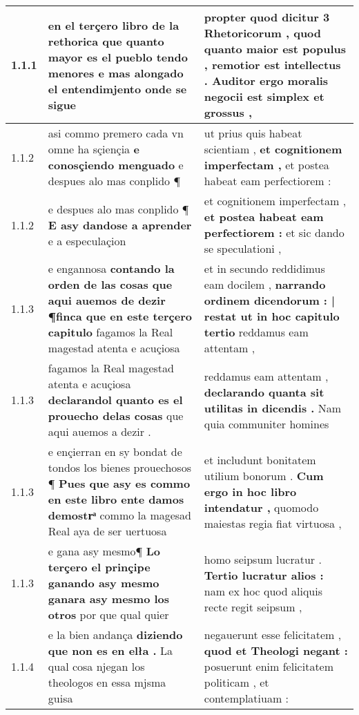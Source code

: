 \begin{tabular}{|p{1cm}|p{6.5cm}|p{6.5cm}|}

\hline
1.1.1 & en el terçero libro de la rethorica \textbf{ que quanto mayor es el pueblo tendo menores } e mas alongado el entendimjento onde se sigue & propter quod dicitur 3 Rhetoricorum , \textbf{ quod quanto maior est populus , } remotior est intellectus . Auditor ergo moralis negocii est simplex et grossus , \\\hline
1.1.2 & asi commo premero cada vn omne ha sçiençia \textbf{ e conosçiendo menguado } e despues alo mas conplido ¶ & ut prius quis habeat scientiam , \textbf{ et cognitionem imperfectam , } et postea habeat eam perfectiorem : \\\hline
1.1.2 & e despues alo mas conplido ¶ \textbf{ E asy dandose a aprender } e a especulaçion & et cognitionem imperfectam , \textbf{ et postea habeat eam perfectiorem : } et sic dando se speculationi , \\\hline
1.1.3 & e engannosa \textbf{ contando la orden de las cosas que aqui auemos de dezir ¶finca que en este terçero capitulo } fagamos la Real magestad atenta e acuçiosa & et in secundo reddidimus eam docilem , \textbf{ narrando ordinem dicendorum : | restat ut in hoc capitulo tertio } reddamus eam attentam , \\\hline
1.1.3 & fagamos la Real magestad atenta e acuçiosa \textbf{ declarandol quanto es el prouecho delas cosas } que aqui auemos a dezir . & reddamus eam attentam , \textbf{ declarando quanta sit utilitas in dicendis . } Nam quia communiter homines \\\hline
1.1.3 & e ençierran en sy bondat de tondos los bienes prouechosos ¶ \textbf{ Pues que asy es commo en este libro ente damos demostrͣ } commo la magesad Real aya de ser uertuosa & et includunt bonitatem utilium bonorum . \textbf{ Cum ergo in hoc libro intendatur , } quomodo maiestas regia fiat virtuosa , \\\hline
1.1.3 & e gana asy mesmo¶ \textbf{ Lo terçero el prinçipe ganando asy mesmo ganara asy mesmo los otros } por que qual quier & homo seipsum lucratur . \textbf{ Tertio lucratur alios : } nam ex hoc quod aliquis recte regit seipsum , \\\hline
1.1.4 & e la bien andança \textbf{ diziendo que non es en elła . } La qual cosa njegan los theologos en essa mjsma guisa & negauerunt esse felicitatem , \textbf{ quod et Theologi negant : } posuerunt enim felicitatem politicam , et contemplatiuam : \\\hline

\end{tabular}
